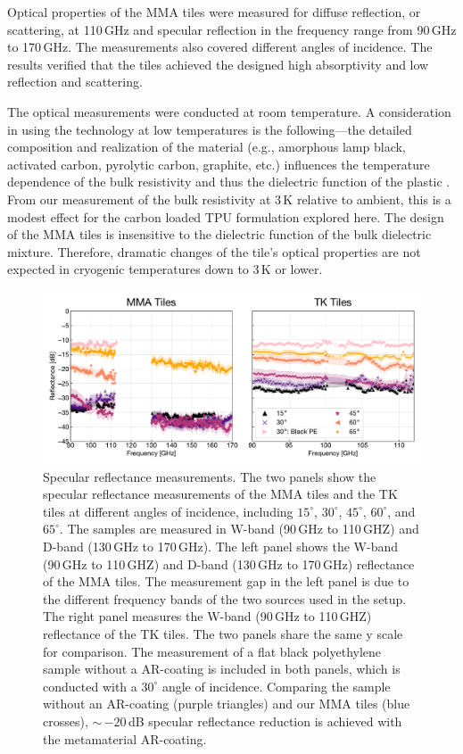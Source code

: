 Optical properties of the MMA tiles were measured for diffuse reflection, or scattering, at 110\,GHz and specular reflection in the frequency range from 90\,GHz to 170\,GHz. The measurements also covered different angles of incidence. The results verified that the tiles achieved the designed high absorptivity and low reflection and scattering.

The optical measurements were conducted at room temperature. A consideration in using the technology at low temperatures is the following---the detailed composition and realization of the material (e.g., amorphous lamp black, activated carbon, pyrolytic carbon, graphite, etc.) influences the temperature dependence of the bulk resistivity and thus the dielectric function of the plastic \cite{Smith1956,Sihvola2008}. From our measurement of the bulk resistivity at 3\,K relative to ambient, this is a modest effect for the carbon loaded TPU formulation explored here. The design of the MMA tiles is insensitive to the dielectric function of the bulk dielectric mixture. Therefore, dramatic changes of the tile's optical properties are not expected in cryogenic temperatures down to 3\,K or lower. 

\begin{figure}[t]
    \centering
    \includegraphics[width = \textwidth]{Figures/refl_2.2020.pdf}
    \caption{Specular reflectance measurements. The two panels show the specular reflectance measurements of the MMA tiles and the TK tiles at different angles of incidence, including $15^{\circ}$, $30^{\circ}$, $45^{\circ}$, $60^{\circ}$, and $65^{\circ}$. The samples are measured in W-band (90\,GHz to 110\,GHZ) and D-band (130\,GHz to 170\,GHz). The left panel shows the W-band (90\,GHz to 110\,GHZ) and D-band (130\,GHz to 170\,GHz) reflectance of the MMA tiles. The measurement gap in the left panel is due to the different frequency bands of the two sources used in the setup. The right panel measures the W-band (90\,GHz to 110\,GHZ) reflectance of the TK tiles. The two panels share the same y scale for comparison. The measurement of a flat black polyethylene sample without a AR-coating is included in both panels, which is conducted with a $30^{\circ}$ angle of incidence. Comparing the sample without an AR-coating (purple triangles) and our MMA tiles (blue crosses), $\sim$\,$-20$\,dB specular reflectance reduction is achieved with the metamaterial AR-coating.}
    \label{fig:reflection_result}
\end{figure}


